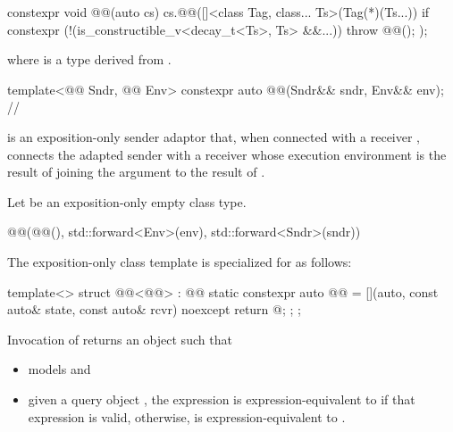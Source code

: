 \pnum
{}
\begin{codeblock}
constexpr void @@(auto cs) {
  cs.@@([]<class Tag, class... Ts>(Tag(*)(Ts...)) {
    if constexpr (!(is_constructible_v<decay_t<Ts>, Ts> &&...))
      throw @@();
  });
}
\end{codeblock}
where  is
a type derived from .

\begin{itemdecl}
template<@@ Sndr, @@ Env>
  constexpr auto @@(Sndr&& sndr, Env&& env);     // \expos
\end{itemdecl}

\begin{itemdescr}
\pnum
{} is an exposition-only sender adaptor that,
when connected with a receiver ,
connects the adapted sender with a receiver
whose execution environment is the result of
joining the  argument 
to the result of .

\pnum
Let  be an exposition-only empty class type.

\pnum
\returns
\begin{codeblock}
@@(@@(), std::forward<Env>(env), std::forward<Sndr>(sndr))
\end{codeblock}

\pnum
\remarks
The exposition-only class template 
is specialized for  as follows:
\begin{codeblock}
template<>
struct @@<@@> : @@ {
  static constexpr auto @@ =
    [](auto, const auto& state, const auto& rcvr) noexcept {
      return @\seebelow@;
    };
};
\end{codeblock}
Invocation of
returns an object  such that
\begin{itemize}
\item
{} models  and
\item
given a query object ,
the expression  is expression-equivalent
to  if that expression is valid,
otherwise,  is expression-equivalent
to .
\end{itemize}
\end{itemdescr}

